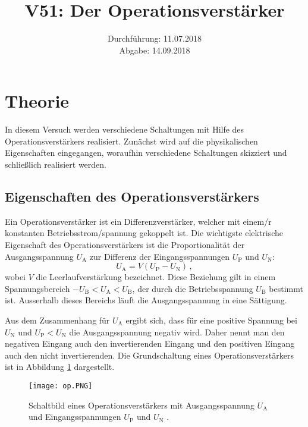 \documentclass[
  bibliography=totoc,     %
  captions=tableheading,  %
  titlepage=firstiscover, %
]{scrartcl}
\title{V51: Der Operationsverstärker}
\author{
  Simon Schulte
  \texorpdfstring{
    \\
    \href{mailto:simon.schulte@udo.edu}{simon.schulte@udo.edu}
  }{}
  \texorpdfstring{\and}{, }
  Tim Sedlaczek
  \texorpdfstring{
    \\
    \href{mailto:tim.sedlaczek@udo.edu}{tim.sedlaczek@udo.edu}
  }{}
}
\date{Durchführung: 11.07.2018\\
      Abgabe: 14.09.2018}
\begin{document}
\maketitle
\thispagestyle{empty}
\setcounter{page}{1}
\section{Theorie}
\label{sec:theorie}
In diesem Versuch werden verschiedene
Schaltungen mit Hilfe des Operationsverstärkers realisiert.
Zunächst wird auf die physikalischen Eigenschaften eingegangen,
woraufhin verschiedene Schaltungen skizziert und schließlich
realisiert werden.

\subsection{Eigenschaften des Operationsverstärkers}
\label{subsec:eigenschaften}
Ein Operationsverstärker ist ein Differenzverstärker, welcher mit einem/r konstanten
Betriebsstrom/spannung gekoppelt ist.
Die wichtigste elektrische Eigenschaft des Operationsverstärkers
ist die Proportionalität der Ausgangsspannung $U_\text{A}$ zur
Differenz der Eingangsspannungen $U_\text{P}$ und $U_\text{N}$:
\begin{equation}
\label{eq:proportionalität}
    U_\text{A} = V(U_\text{P} - U_\text{N})\,,
\end{equation}
wobei $V$ die Leerlaufverstärkung bezeichnet.
Diese Beziehung gilt in einem Spannungsbereich
$-U_\text{B} < U_\text{A} < U_\text{B}$, der durch die Betriebsspannung
$U_\text{B}$ bestimmt ist. Ausserhalb dieses Bereichs läuft die
Ausgangsspannung in eine Sättigung.

\noindent
Aus dem Zusammenhang für $U_\text{A}$ ergibt sich, dass für eine positive Spannung
bei $U_\text{N}$ und $U_\text{P} \less U_\text{N}$ die Ausgangsspannung negativ wird.
Daher nennt man den negativen Eingang auch den invertierenden Eingang und den positiven
Eingang auch den nicht invertierenden.
Die Grundschaltung eines Operationsverstärkers ist in Abbildung \ref{fig:op} dargestellt.
\begin{figure}
    \centering
    \texttt{[image: op.PNG]}
    \caption{
        Schaltbild eines Operationsverstärkers mit Ausgangsspannung
        $U_\text{A}$ und Eingangsspannungen $U_\text{P}$ und
        $U_\text{N}$ \cite{V51}.
    }
    \label{fig:op}
\end{figure}
\end{document}
